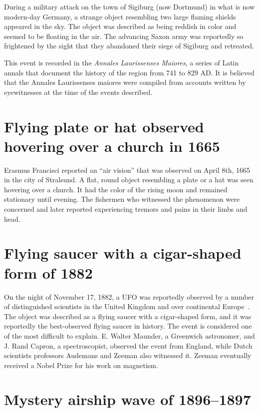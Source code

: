During a military attack on the town of Sigiburg (now Dortmund) in what is now modern-day Germany, a strange object resembling two large
flaming shields appeared in the sky. The object was described as being reddish in color and seemed to be floating in the air.
The advancing Saxon army was reportedly so frightened by the sight that they abandoned their siege of Sigiburg and retreated.

This event is recorded in the {\it Annales Laurissenses Maiores}, a series of Latin annals that document the history of the region from 741 to 829 AD. It is believed that the Annales Laurissenses maiores were compiled from accounts written by eyewitnesses at the time of the events described.

\section{Flying plate or hat observed hovering over a church in 1665}
\label{2023-UFO-part-History-chapter-pre-1945-fpohhoc1665}

Erasmus Francisci reported an ``air vision'' that was observed on April 8th, 1665~\cite{VonLudwiger1998Jan} in the city of Stralsund. A flat, round object resembling a plate or a hat was seen hovering over a church. It had the color of the rising moon and remained stationary until evening. The fishermen who witnessed the phenomenon were concerned and later reported experiencing tremors and pains in their limbs and head.

\section{Flying saucer with a cigar-shaped form of 1882}
\label{2023-UFO-part-History-chapter-pre-1945-fswcsf1882}

On the night of November 17, 1882, a UFO was reportedly observed by a number of distinguished scientists in the United Kingdom and over continental Europe~\cite[Chapter~7]{Menzel_1953}. The object was described as a flying saucer with a cigar-shaped form, and it was reportedly the best-observed flying saucer in history. The event is considered one of the most difficult to explain. E. Walter Maunder, a Greenwich astronomer, and J. Rand Capron, a spectroscopist, observed the event from England, while Dutch scientists professors Audemans and Zeeman also witnessed it. Zeeman eventually received a Nobel Prize for his work on magnetism.


\section{Mystery airship wave of 1896--1897}
\label{2023-UFO-part-History-chapter-pre-1945-masw18967}

